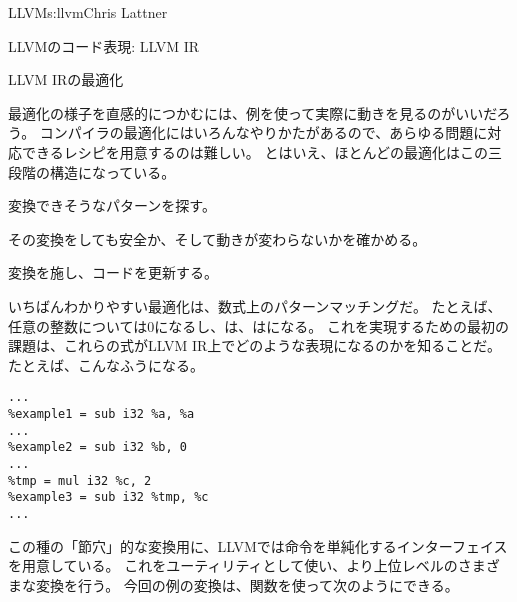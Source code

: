 \begin{aosachapter}{LLVM}{s:llvm}{Chris Lattner}
\begin{aosasect1}{LLVMのコード表現: LLVM IR}
\begin{aosasect2}{LLVM IRの最適化}

最適化の様子を直感的につかむには、例を使って実際に動きを見るのがいいだろう。
コンパイラの最適化にはいろんなやりかたがあるので、あらゆる問題に対応できるレシピを用意するのは難しい。
とはいえ、ほとんどの最適化はこの三段階の構造になっている。

\begin{aosaitemize}

  \item 変換できそうなパターンを探す。

  \item その変換をしても安全か、そして動きが変わらないかを確かめる。

  \item 変換を施し、コードを更新する。

\end{aosaitemize}

いちばんわかりやすい最適化は、数式上のパターンマッチングだ。
たとえば、任意の整数については0になるし、は、はになる。
これを実現するための最初の課題は、これらの式がLLVM IR上でどのような表現になるのかを知ることだ。
たとえば、こんなふうになる。

\begin{verbatim}
...
%example1 = sub i32 %a, %a
...
%example2 = sub i32 %b, 0
...
%tmp = mul i32 %c, 2
%example3 = sub i32 %tmp, %c
...
\end{verbatim}

この種の「節穴」的な変換用に、LLVMでは命令を単純化するインターフェイスを用意している。
これをユーティリティとして使い、より上位レベルのさまざまな変換を行う。
今回の例の変換は、関数を使って次のようにできる。


\end{aosasect2}
\end{aosasect1}
\end{aosachapter}
